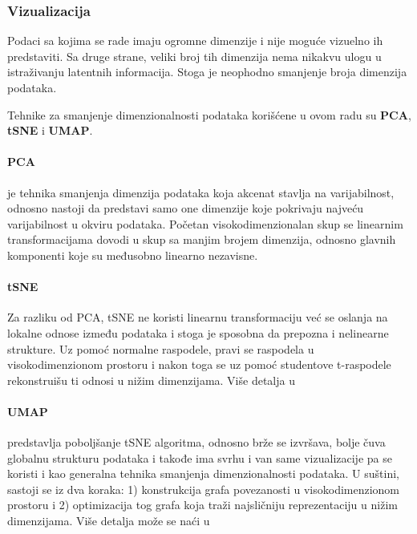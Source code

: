 \documentclass{article}
\begin{document}
\subsubsection{Vizualizacija}

Podaci sa kojima se rade imaju ogromne dimenzije i nije moguće vizuelno ih predstaviti. Sa druge strane, veliki broj tih dimenzija nema nikakvu ulogu u istraživanju latentnih informacija. Stoga je neophodno smanjenje broja dimenzija podataka. 

Tehnike za smanjenje dimenzionalnosti podataka korišćene u ovom radu su \textbf{PCA}, \textbf{tSNE} i \textbf{UMAP}.

\paragraph{PCA} je tehnika smanjenja dimenzija podataka koja akcenat stavlja na varijabilnost, odnosno nastoji da predstavi samo one dimenzije koje pokrivaju najveću varijabilnost u okviru podataka. Početan visokodimenzionalan skup se linearnim transformacijama dovodi u skup sa manjim brojem dimenzija, odnosno glavnih komponenti koje su međusobno linearno nezavisne.

\paragraph{tSNE} Za razliku od PCA, tSNE ne koristi linearnu transformaciju već se oslanja na lokalne odnose između podataka i stoga je sposobna da prepozna i nelinearne strukture. Uz pomoć normalne raspodele, pravi se raspodela u visokodimenzionom prostoru i nakon toga se uz pomoć studentove t-raspodele rekonstruišu ti odnosi u nižim dimenzijama. Više detalja u \cite{maaten2008visualizing, wattenberg2016how}

\paragraph{UMAP} predstavlja poboljšanje tSNE algoritma, odnosno brže se izvršava, bolje čuva globalnu strukturu podataka i takođe ima svrhu i van same vizualizacije pa se koristi i kao generalna tehnika smanjenja dimenzionalnosti podataka. U suštini, sastoji se iz dva koraka: 1) konstrukcija grafa povezanosti u visokodimenzionom prostoru i 2) optimizacija tog grafa koja traži najsličniju reprezentaciju u nižim dimenzijama. Više detalja može se naći u \cite{mcinnes2018umap, umapexplain}
\end{document}
